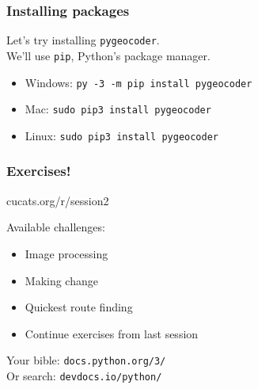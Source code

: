 \documentclass[notes]{beamer}
\begin{document}
	\begin{frame}[fragile]
		\frametitle{Installing packages}
		Let's try installing \colorbox{codebg}{\lstinline|pygeocoder|}.\\
		\vspace{10pt}
		We'll use \colorbox{codebg}{\lstinline|pip|}, Python's package manager.\\
		\vspace{10pt}
		\begin{itemize}
			\item Windows: \colorbox{codebg}{\lstinline|py -3 -m pip install pygeocoder|}
			\item Mac: \colorbox{codebg}{\lstinline|sudo pip3 install pygeocoder|}
			\item Linux: \colorbox{codebg}{\lstinline|sudo pip3 install pygeocoder|}
		\end{itemize}
	\end{frame}

	\begin{frame}[fragile]
		\frametitle{Exercises!}
		\vfill
		\centerline{\LARGE cucats.org/r/session2}
		\vfill
		Available challenges:
		\begin{itemize}
			\item Image processing
			\item Making change
			\item Quickest route finding
			\item Continue exercises from last session
		\end{itemize}
		\vspace{10pt}
		Your bible: \lstinline|docs.python.org/3/|\\
		Or search: \lstinline|devdocs.io/python/|
	\end{frame}
\end{document}
